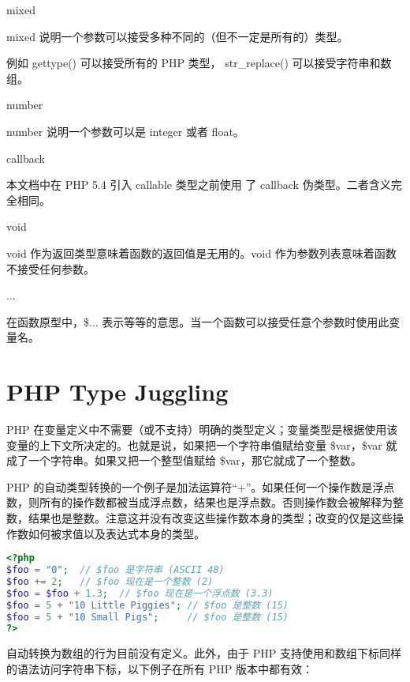\begin{compactitem}
\item mixed

mixed 说明一个参数可以接受多种不同的（但不一定是所有的）类型。

例如 gettype() 可以接受所有的 PHP 类型， str\_replace() 可以接受字符串和数组。

\item number

number 说明一个参数可以是 integer 或者 float。

\item callback

本文档中在 PHP 5.4 引入 callable 类型之前使用 了 callback 伪类型。二者含义完全相同。

\item void

void 作为返回类型意味着函数的返回值是无用的。void 作为参数列表意味着函数不接受任何参数。

\item ... 

在函数原型中，\$... 表示等等的意思。当一个函数可以接受任意个参数时使用此变量名。

\end{compactitem}



\section{PHP Type Juggling}


PHP 在变量定义中不需要（或不支持）明确的类型定义；变量类型是根据使用该变量的上下文所决定的。也就是说，如果把一个字符串值赋给变量 \$var，\$var 就成了一个字符串。如果又把一个整型值赋给 \$var，那它就成了一个整数。

PHP 的自动类型转换的一个例子是加法运算符“+”。如果任何一个操作数是浮点数，则所有的操作数都被当成浮点数，结果也是浮点数。否则操作数会被解释为整数，结果也是整数。注意这并没有改变这些操作数本身的类型；改变的仅是这些操作数如何被求值以及表达式本身的类型。




\begin{lstlisting}[language=PHP]
<?php
$foo = "0";  // $foo 是字符串 (ASCII 48)
$foo += 2;   // $foo 现在是一个整数 (2)
$foo = $foo + 1.3;  // $foo 现在是一个浮点数 (3.3)
$foo = 5 + "10 Little Piggies"; // $foo 是整数 (15)
$foo = 5 + "10 Small Pigs";     // $foo 是整数 (15)
?>
\end{lstlisting}


自动转换为数组的行为目前没有定义。此外，由于 PHP 支持使用和数组下标同样的语法访问字符串下标，以下例子在所有 PHP 版本中都有效：

